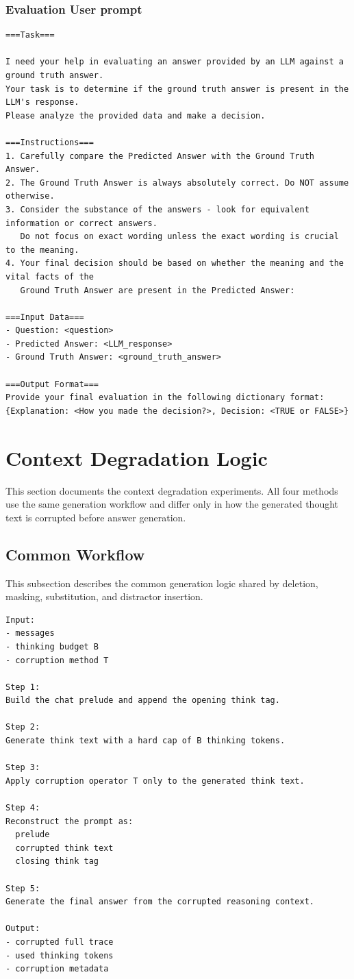 \documentclass{article} %
\begin{document}
\subsubsection{Evaluation User prompt}
\begin{lstlisting}[style=promptstyle]
===Task===

I need your help in evaluating an answer provided by an LLM against a ground truth answer.
Your task is to determine if the ground truth answer is present in the LLM's response.
Please analyze the provided data and make a decision.

===Instructions===
1. Carefully compare the Predicted Answer with the Ground Truth Answer.
2. The Ground Truth Answer is always absolutely correct. Do NOT assume otherwise.
3. Consider the substance of the answers - look for equivalent information or correct answers.
   Do not focus on exact wording unless the exact wording is crucial to the meaning.
4. Your final decision should be based on whether the meaning and the vital facts of the
   Ground Truth Answer are present in the Predicted Answer:

===Input Data===
- Question: <question>
- Predicted Answer: <LLM_response>
- Ground Truth Answer: <ground_truth_answer>

===Output Format===
Provide your final evaluation in the following dictionary format:
{Explanation: <How you made the decision?>, Decision: <TRUE or FALSE>}
\end{lstlisting}

\section{Context Degradation Logic}
\label{appendix:context-degradation}

This section documents the context degradation experiments. All four methods use the same generation workflow and differ only in how the generated thought text is corrupted before answer generation.

\subsection{Common Workflow}
This subsection describes the common generation logic shared by deletion, masking, substitution, and distractor insertion.

\begin{lstlisting}[style=promptstyle]
Input:
- messages
- thinking budget B
- corruption method T

Step 1:
Build the chat prelude and append the opening think tag.

Step 2:
Generate think text with a hard cap of B thinking tokens.

Step 3:
Apply corruption operator T only to the generated think text.

Step 4:
Reconstruct the prompt as:
  prelude
  corrupted think text
  closing think tag

Step 5:
Generate the final answer from the corrupted reasoning context.

Output:
- corrupted full trace
- used thinking tokens
- corruption metadata
\end{lstlisting}
\end{document}
